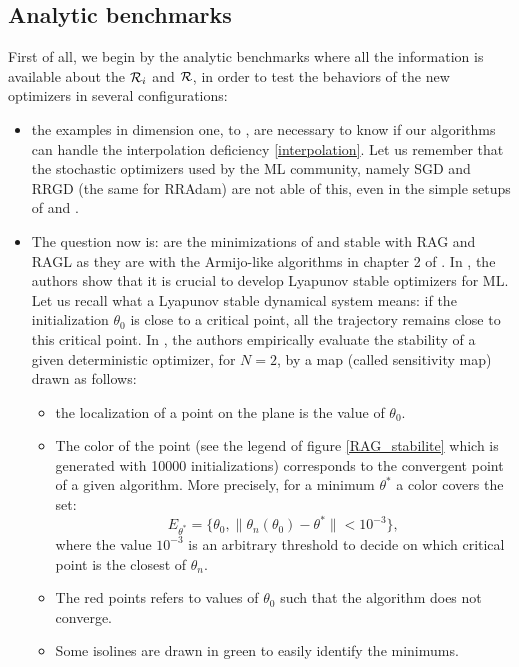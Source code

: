 \subsection{Analytic benchmarks}
\label{test_analytic}

First of all, we begin by the analytic benchmarks where all the information is available about the $\mathcal{R}_i$ and $\mathcal{R}$, in order to test the behaviors of the new optimizers in several configurations:
\begin{itemize}
	\item the examples in dimension one, \exOne to \exHeight, are necessary to know if our algorithms can handle the interpolation deficiency \eqref{interpolation}. Let us remember that the stochastic optimizers used by the ML community, namely SGD and RRGD (the same for RRAdam) are not able of this, even in the simple setups of \exOne and \exTwo. 
	\item The question now is: are the minimizations of \polyTwo and \polyThree stable with RAG and RAGL as they are with the Armijo-like algorithms in chapter 2 of \cite{Bilel_thesis}. In \cite{Bilel}, the authors show that it is crucial to develop Lyapunov stable optimizers for ML. Let us recall what a Lyapunov stable dynamical system means: if the initialization $\theta_0$ is close to a critical point, all the trajectory remains close to this critical point. In \cite{Bilel}, the authors empirically evaluate the stability of a given deterministic optimizer, for $N=2$, by a map (called sensitivity map) drawn as follows:
	\begin{itemize}
		\item the localization of a point on the plane is the value of $\theta_0$.
		\item The color of the point (see the legend of figure \ref{RAG_stabilite} which is generated with 10000 initializations) corresponds to the convergent point of a given algorithm. More precisely, for a minimum $\theta^*$ a color covers the set:
		\begin{equation*}
			E_{\theta^*} = \{ \theta_0, \|\theta_n(\theta_0)-\theta^*\| < 10^{-3} \},
		\end{equation*}
		where the value $10^{-3}$ is an arbitrary threshold to decide on which critical point is the closest of $\theta_n$.
		\item The red points refers to values of $\theta_0$ such that the algorithm does not converge.
		\item Some isolines are drawn in green to easily identify the minimums.
	\end{itemize}

\end{itemize}
